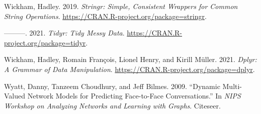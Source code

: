 \documentclass[
]{article}
\newlength{\cslhangindent}
\newlength{\cslentryspacingunit} %
\newenvironment{CSLReferences}[2] %
 {%
  \setlength{\parindent}{0pt}
  \ifodd #1
  \let\oldpar\par
  \def\par{\hangindent=\cslhangindent\oldpar}
  \fi
  \setlength{\parskip}{#2\cslentryspacingunit}
 }%
 {}
\begin{document}
\begin{CSLReferences}{1}{0}
\leavevmode{}%
Wickham, Hadley. 2019. \emph{Stringr: Simple, Consistent Wrappers for Common String Operations}. \url{https://CRAN.R-project.org/package=stringr}.

\leavevmode{}%
---------. 2021. \emph{Tidyr: Tidy Messy Data}. \url{https://CRAN.R-project.org/package=tidyr}.

\leavevmode{}%
Wickham, Hadley, Romain François, Lionel Henry, and Kirill Müller. 2021. \emph{Dplyr: A Grammar of Data Manipulation}. \url{https://CRAN.R-project.org/package=dplyr}.

\leavevmode{}%
Wyatt, Danny, Tanzeem Choudhury, and Jeff Bilmes. 2009. {``Dynamic Multi-Valued Network Models for Predicting Face-to-Face Conversations.''} In \emph{NIPS Workshop on Analyzing Networks and Learning with Graphs}. Citeseer.

\end{CSLReferences}
\end{document}
